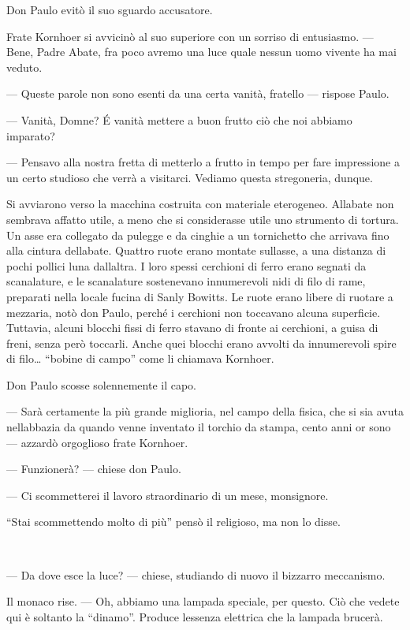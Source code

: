 Don Paulo evitò il suo sguardo accusatore.

Frate Kornhoer si avvicinò al suo superiore con un sorriso di
entusiasmo. --- Bene, Padre Abate, fra poco avremo una luce quale nessun
uomo vivente ha mai veduto.

--- Queste parole non sono esenti da una certa vanità, fratello ---
rispose Paulo.

--- Vanità, Domne? É vanità mettere a buon frutto ciò che noi abbiamo
imparato?

--- Pensavo alla nostra fretta di metterlo a frutto in tempo per fare
impressione a un certo studioso che verrà a visitarci. Vediamo questa
stregoneria, dunque.

Si avviarono verso la macchina costruita con materiale eterogeneo.
All\textquotesingle abate non sembrava affatto utile, a meno che si
considerasse utile uno strumento di tortura. Un asse era collegato da
pulegge e da cinghie a un tornichetto che arrivava fino alla cintura
dell\textquotesingle abate. Quattro ruote erano montate
sull\textquotesingle asse, a una distanza di pochi pollici
l\textquotesingle una dall\textquotesingle altra. I loro spessi
cerchioni di ferro erano segnati da scanalature, e le scanalature
sostenevano innumerevoli nidi di filo di rame, preparati nella locale
fucina di Sanly Bowitts. Le ruote erano libere di ruotare a
mezz\textquotesingle aria, notò don Paulo, perché i cerchioni non
toccavano alcuna superficie. Tuttavia, alcuni blocchi fissi di ferro
stavano di fronte ai cerchioni, a guisa di freni, senza però toccarli.
Anche quei blocchi erano avvolti da innumerevoli spire di filo\ldots{}
``bobine di campo'' come li chiamava Kornhoer.

Don Paulo scosse solennemente il capo.

--- Sarà certamente la più grande miglioria, nel campo della fisica, che
si sia avuta nell\textquotesingle abbazia da quando venne inventato il
torchio da stampa, cento anni or sono --- azzardò orgoglioso frate
Kornhoer.

--- Funzionerà? --- chiese don Paulo.

--- Ci scommetterei il lavoro straordinario di un mese, monsignore.

``Stai scommettendo molto di più'' pensò il religioso, ma non lo disse.

~

--- Da dove esce la luce? --- chiese, studiando di nuovo il bizzarro
meccanismo.

Il monaco rise. --- Oh, abbiamo una lampada speciale, per questo. Ciò
che vedete qui è soltanto la ``dinamo''. Produce
l\textquotesingle essenza elettrica che la lampada brucerà.

